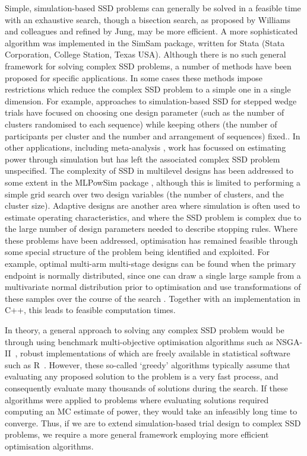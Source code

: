\documentclass[sagev, Crown]{sagej}
\begin{document}
Simple, simulation-based SSD problems can generally be solved in a feasible time with an exhaustive search,\cite{Feiveson2002, Browne2009} though a bisection search, as proposed by Williams and colleagues and refined by Jung,\cite{Williams2007, Jung2008a} may be more efficient. A more sophisticated algorithm was implemented in the SimSam package,\cite{Hooper2013} written for Stata (Stata Corporation, College Station, Texas USA). Although there is no such general framework for solving complex SSD problems, a number of methods have been proposed for specific applications. In some cases these methods impose restrictions which reduce the complex SSD problem to a simple one in a single dimension. For example, approaches to simulation-based SSD for stepped wedge trials have focused on choosing one design parameter (such as the number of clusters randomised to each sequence) while keeping others (the number of participants per cluster and the number and arrangement of sequences) fixed.\cite{Baio2015, Hooper2016}. In other applications, including meta-analysis \cite{Kontopantelis2016}, work has focussed on estimating power through simulation but has left the associated complex SSD problem unspecified. The complexity of SSD in multilevel designs has been addressed to some extent in the MLPowSim package \cite{Browne2009}, although this is limited to performing a simple grid search over two design variables (the number of clusters, and the cluster size). Adaptive designs are another area where simulation is often used to estimate operating characteristics, and where the SSD problem is complex due to the large number of design parameters needed to describe stopping rules. Where these problems have been addressed, optimisation has remained feasible through some special structure of the problem being identified and exploited. For example, optimal multi-arm multi-stage designs can be found when the primary endpoint is normally distributed, since one can draw a single large sample from a multivariate normal distribution prior to optimisation and use transformations of these samples over the course of the search \cite{Wason2012}. Together with an implementation in C++, this leads to feasible computation times.

In theory, a general approach to solving any complex SSD problem would be through using benchmark multi-objective optimisation algorithms such as NSGA-II~\cite{Deb2002}, robust implementations of which are freely available in statistical software such as R~\cite{Mersmann2014}. However, these so-called `greedy' algorithms typically assume that evaluating any proposed solution to the problem is a very fast process, and consequently evaluate many thousands of solutions during the search. If these algorithms were applied to problems where evaluating solutions required computing an MC estimate of power, they would take an infeasibly long time to converge. Thus, if we are to extend simulation-based trial design to complex SSD problems, we require a more general framework employing more efficient optimisation algorithms. 
\end{document}
